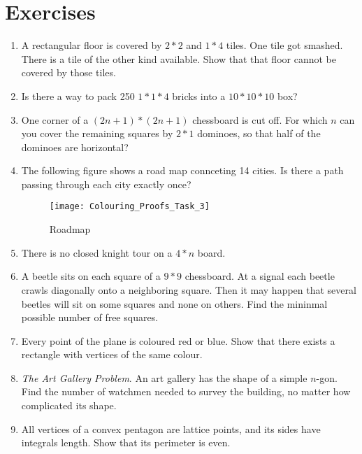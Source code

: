 \documentclass[11pt,a5paper]{article}
\begin{document}
\section{Exercises}

\begin{enumerate}

\item{A rectangular floor is covered by $2*2$ and $1*4$ tiles. One tile got smashed. There is a tile of the other kind available. Show that that floor cannot be covered by those tiles.}

\item{Is there a way to pack 250 $1*1*4$ bricks into a $10*10*10$ box?}

\item{One corner of a $(2n+1)*(2n+1)$ chessboard is cut off. For which $n$ can you cover the remaining squares by $2*1$ dominoes, so that half of the dominoes are horizontal?}

\item{The following figure shows a road map connceting 14 cities. Is there a path passing through each city exactly once?
\begin{figure}[h]
\begin{center}
\texttt{[image: Colouring\_Proofs\_Task\_3]} 
\caption{Roadmap}
\end{center}
\end{figure}
}

\item{There is no closed knight tour on a $4*n$ board.}

\item{A beetle sits on each square of a $9*9$ chessboard. At a signal each beetle crawls diagonally onto a neighboring square. Then it may happen that several beetles will sit on some squares and none on others. Find the mininmal possible number of free squares.}

\item{Every point of the plane is coloured red or blue. Show that there exists a rectangle with vertices of the same colour.}

\item{ \emph{The Art Gallery Problem}. An art gallery has the shape of a simple $n$-gon. Find the number of watchmen needed to survey the building, no matter how complicated its shape.}

\item{All vertices of a convex pentagon are lattice points, and its sides have integrals length. Show that its perimeter is even.}


\end{enumerate}
\end{document}
